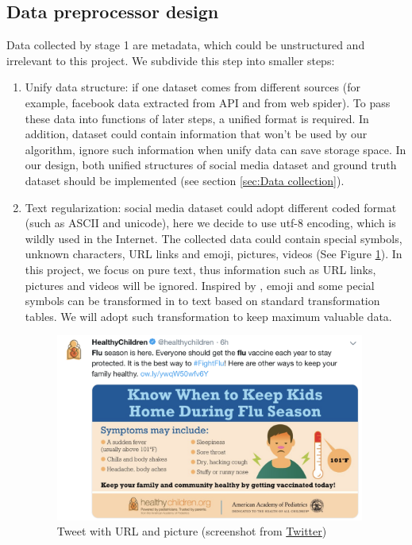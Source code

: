 \subsection{Data preprocessor design}
\label{sec:Data preprocessor design}
Data collected by stage 1 are metadata, which could be unstructured and irrelevant to this project. We subdivide this step into smaller steps:
\begin{enumerate}
    \item Unify data structure: if one dataset comes from different sources (for example, facebook data extracted from API and from web spider). To pass these data into functions of later steps, a unified format is required. In addition, dataset could contain information that won't be used by our algorithm, ignore such information when unify data can save storage space. In our design, both unified structures of social media dataset and ground truth dataset should be implemented (see section \ref{sec:Data collection}). 
    \item Text regularization: social media dataset could adopt different coded format (such as ASCII and unicode), here we decide to use utf-8 encoding, which is wildly used in the Internet. The collected data could contain special symbols, unknown characters, URL links and emoji, pictures, videos (See Figure \ref{fig:tsc1}). In this project, we focus on pure text, thus information such as URL links, pictures and videos will be ignored. Inspired by \cite{serban2019real}, emoji and some pecial symbols can be transformed in to text based on standard transformation tables. We will adopt such transformation to keep maximum valuable data.
    \begin{figure}[!htp]
        \center
        \includegraphics[width=4in]{images/tsc1.png}
        \caption{Tweet with URL and picture (screenshot from \href{https://twitter.com/search?q=flu&src=typed_query}{Twitter})}
        \label{fig:tsc1}
    \end{figure}

\end{enumerate}
